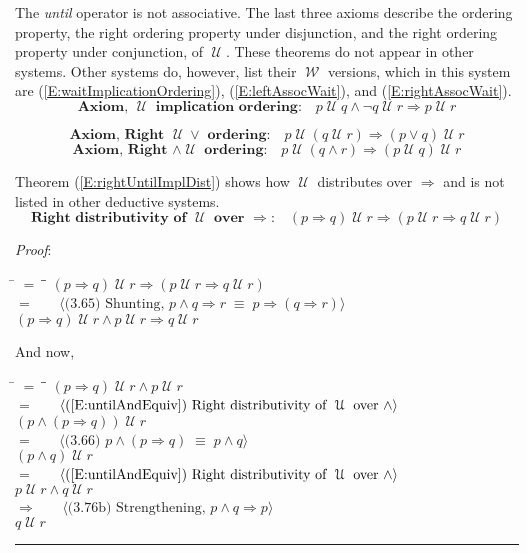 \documentclass[12pt, fleqn, leqno]{article}
\newcommand{\lgap}{2pt}                             %
\newcommand{\mymathindent}{24pt}                    %
\newcommand{\equivs}{\ensuremath{\;\equiv\;}}       %
\newcommand{\impl}{\ensuremath{\Rightarrow}}        %
\newcommand{\Until}{\;\mathcal{U}\;}
\newcommand{\Wait}{\;\mathcal{W}\;}
\newcommand{\myqed}{\rule[-.23ex]{1.2ex}{2.0ex}}
\newcommand{\myqedtab}{\hspace{384pt}}              %
\newcommand{\firstspacer}{\vspace{-26pt}}
\newcommand{\Gll} {\langle}                         %
\newcommand{\Ggg} {\rangle}                         %
\newcommand{\Hint}[1]     {\ \ \ $\Gll              \mbox{#1} \Ggg$ }   %
\begin{document}
The \textit{until} operator is not associative.
The last three axioms describe the ordering property, the right ordering property under disjunction, and the right ordering property under conjunction, of $\Until$.
These theorems do not appear in other systems.
Other systems do, however, list their $\Wait$ versions, which in this system are (\ref{E:waitImplicationOrdering}), (\ref{E:leftAssocWait}), and (\ref{E:rightAssocWait}).
\begin{equation}\label{E:untilImplicationOrdering}
\textbf{Axiom, $\Until$ implication ordering:}\quad p \Until q \land \neg q \Until r \impl p \Until r
\end{equation}

\firstspacer

\begin{equation}\label{E:leftAssocUntil}
\textbf{Axiom, Right $\Until \lor$ ordering:}\quad p \Until (q \Until r) \impl (p\lor q) \Until r
\end{equation}
\begin{equation}\label{E:rightAssocUntil}
\textbf{Axiom, Right $\land \Until$ ordering:}\quad p \Until (q\land r) \impl (p \Until q) \Until r
\end{equation}

Theorem (\ref{E:rightUntilImplDist}) shows how $\Until$ distributes over $\impl$ and is not listed in other deductive systems.
\begin{equation}\label{E:rightUntilImplDist}
\textbf{Right distributivity of $\Until$ over $\impl$:}\quad (p \impl q) \Until r\impl (p \Until r \impl q \Until r)
\end{equation}

\emph{Proof}:
\begin{tabbing}
\hspace{\mymathindent} \= $= \;$ \= \myqedtab \= \kill
  \> \>   $(p \impl q) \Until r\impl (p \Until r \impl q \Until r)$\\[\lgap]
  \> $=$  \>  \Hint{(3.65) Shunting, $p\land q\impl r\equivs p\impl (q\impl r)$}\\[\lgap]
  \> \>   $(p \impl q) \Until r\land p \Until r \impl q \Until r$
\end{tabbing}
And now,
\begin{tabbing}
\hspace{\mymathindent} \= $= \;$ \= \myqedtab \= \kill
  \> \>   $(p \impl q) \Until r\land p \Until r$\\[\lgap]
  \> $=$ \> \Hint{(\ref{E:untilAndEquiv}) Right distributivity of $\Until$ over $\land$} \\[\lgap]
  \> \>   $(p\land (p\impl q)) \Until r$\\[\lgap]
  \> $=$  \>  \Hint{(3.66) $p\land (p \impl q) \equivs p \land q$}\\[\lgap]
  \> \>   $(p\land q) \Until r$\\[\lgap]
  \> $=$ \> \Hint{(\ref{E:untilAndEquiv}) Right distributivity of $\Until$ over $\land$} \\[\lgap]
  \> \>   $p\Until r\land q\Until r$\\[\lgap]
  \> $\impl$ \> \Hint{(3.76b) Strengthening, $p\land q \impl p$} \\[\lgap]
  \> \>   $q\Until r$ \quad \myqed
\end{tabbing}
\end{document}
